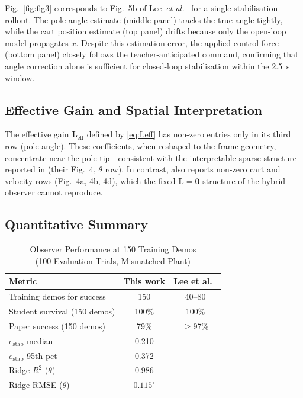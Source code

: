 \documentclass[conference]{IEEEtran}
\newcommand{\Lmat}{\bm{L}}
\begin{document}
Fig.~\ref{fig:fig3} corresponds to Fig.~5b of Lee~\emph{et al.}~\cite{lee2024}
for a single stabilisation rollout.  The pole angle estimate (middle panel)
tracks the true angle tightly, while the cart position estimate (top panel)
drifts because only the open-loop model propagates $x$.  Despite this
estimation error, the applied control force (bottom panel) closely follows the
teacher-anticipated command, confirming that angle correction alone is
sufficient for closed-loop stabilisation within the 2.5~s window.

\subsection{Effective Gain and Spatial Interpretation}

The effective gain $\Lmat_{\mathrm{eff}}$ defined by \eqref{eq:Leff} has
non-zero entries only in its third row (pole angle).  These coefficients, when
reshaped to the frame geometry, concentrate near the pole tip---consistent with
the interpretable sparse structure reported in \cite{lee2024} (their Fig.~4,
$\theta$ row).  In contrast, \cite{lee2024} also reports non-zero cart and
velocity rows (Fig.~4a, 4b, 4d), which the fixed $\Lmat=\bm{0}$ structure of
the hybrid observer cannot reproduce.

\subsection{Quantitative Summary}

\begin{table}[t]
  \centering
  \caption{Observer Performance at 150 Training Demos\\
    (100 Evaluation Trials, Mismatched Plant)}
  \label{tab:results}
  \renewcommand{\arraystretch}{1.15}
  \begin{tabular}{lcc}
    \toprule
    Metric & This work & Lee et al.~\cite{lee2024} \\
    \midrule
    Training demos for success & 150   & 40--80    \\
    Student survival (150 demos) & 100\% & 100\%   \\
    Paper success (150 demos)    & 79\%  & $\ge$97\% \\
    $e_{\mathrm{stab}}$ median   & 0.210 & ---       \\
    $e_{\mathrm{stab}}$ 95th pct & 0.372 & ---       \\
    Ridge $R^2$ ($\theta$)       & 0.986 & ---       \\
    Ridge RMSE ($\theta$)        & $0.115^\circ$ & --- \\
    \bottomrule
  \end{tabular}
\end{table}
\end{document}
